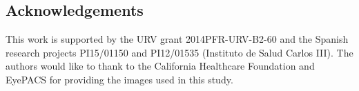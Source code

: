 \documentclass[a0,portrait]{a0poster}
\begin{document}
\begin{multicols}{3}
\section*{Acknowledgements}

\small{This work is supported by the URV grant 2014PFR-URV-B2-60 and the Spanish research projects PI15/01150 and PI12/01535 (Instituto de Salud Carlos III). The authors would like to thank to the California Healthcare Foundation and EyePACS for providing the images used in this study.}


\end{multicols}
\end{document}
